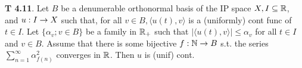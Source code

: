 {\bf T 4.11}. Let $B$ be a denumerable orthonormal basis of the IP space $X, I \subseteq \mathbb{R}$, and $u: I \rightarrow X$ such that, for all $v \in B, \langle u(t),v\rangle$ is a (uniformly) cont func of $t \in I$. Let $\{\alpha_v; v \in B\}$ be a family in $\mathbb{R}_+$ such that $|\langle u(t),v\rangle | \leq \alpha_v$ for all $t \in I$ and $v \in B$. Assume that there is some bijective $f:  \mathbb{N}\rightarrow B$ s.t. the series $\sum_{n=1}^{\infty} \alpha_{f(n)}^2$ converges in $\mathbb{R}$. Then $u$ is (unif) cont.  
